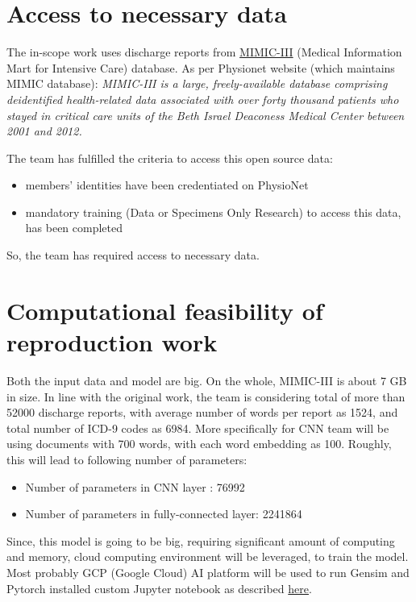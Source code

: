 \documentclass[11pt,a4paper]{article}
\begin{document}
\section{Access to necessary data}
The in-scope work uses discharge reports from \href{https://physionet.org/content/mimiciii/1.4/}{MIMIC-III} (Medical Information Mart for Intensive Care) database. As per Physionet website (which maintains MIMIC database): \emph{MIMIC-III is a large, freely-available database comprising deidentified health-related data associated with over forty thousand patients who stayed in critical care units of the Beth Israel Deaconess Medical Center between 2001 and 2012.} 

The team has fulfilled the criteria to access this open source data:
\begin{itemize}
	\item members’ identities have been credentiated on PhysioNet
	\item mandatory training (Data or Specimens Only Research) to access this data, has been completed
\end{itemize}
So, the team has required access to necessary data.

\section{Computational feasibility of reproduction work}
Both the input data and model are big. On the whole, MIMIC-III is about 7 GB in size. In line with the original work, the team is considering total of more than 52000 discharge reports, with average number of words per report as 1524, and total number of ICD-9 codes as 6984. More specifically for CNN team will be using documents with 700 words, with each word embedding as 100. Roughly, this will lead to following number of parameters:
\begin{itemize}
    \item Number of parameters in CNN layer            : 76992
    \item Number of parameters in fully-connected layer: 2241864
\end{itemize}

Since, this model is going to be big, requiring significant amount of computing and memory, cloud computing environment will be leveraged, to train the model. Most probably GCP (Google Cloud) AI platform will be used to run Gensim and Pytorch installed custom Jupyter notebook as described \href{https://cloud.google.com/ai-platform/training/docs/train-ml-model-pytorch}{here}.
\end{document}
